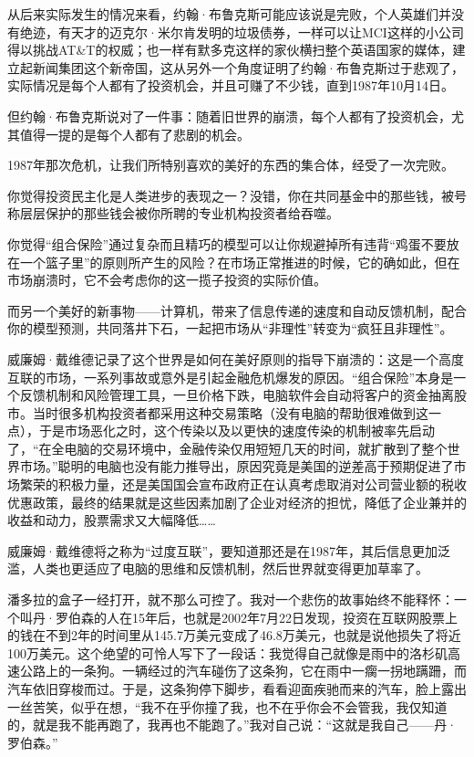 从后来实际发生的情况来看，约翰·布鲁克斯可能应该说是完败，个人英雄们并没有绝迹，有天才的迈克尔·米尔肯发明的垃圾债券，一样可以让MCI这样的小公司得以挑战AT\&T的权威；也一样有默多克这样的家伙横扫整个英语国家的媒体，建立起新闻集团这个新帝国，这从另外一个角度证明了约翰·布鲁克斯过于悲观了，实际情况是每个人都有了投资机会，并且可赚了不少钱，直到1987年10月14日。

但约翰·布鲁克斯说对了一件事：随着旧世界的崩溃，每个人都有了投资机会，尤其值得一提的是每个人都有了悲剧的机会。

1987年那次危机，让我们所特别喜欢的美好的东西的集合体，经受了一次完败。

你觉得投资民主化是人类进步的表现之一？没错，你在共同基金中的那些钱，被号称层层保护的那些钱会被你所聘的专业机构投资者给吞噬。

你觉得``组合保险''通过复杂而且精巧的模型可以让你规避掉所有违背``鸡蛋不要放在一个篮子里''的原则所产生的风险？在市场正常推进的时候，它的确如此，但在市场崩溃时，它不会考虑你的这一揽子投资的实际价值。

而另一个美好的新事物------计算机，带来了信息传递的速度和自动反馈机制，配合你的模型预测，共同落井下石，一起把市场从``非理性''转变为``疯狂且非理性''。

威廉姆·戴维德记录了这个世界是如何在美好原则的指导下崩溃的：这是一个高度互联的市场，一系列事故或意外是引起金融危机爆发的原因。``组合保险''本身是一个反馈机制和风险管理工具，一旦价格下跌，电脑软件会自动将客户的资金抽离股市。当时很多机构投资者都采用这种交易策略（没有电脑的帮助很难做到这一点），于是市场恶化之时，这个传染以及以更快的速度传染的机制被率先启动了，``在全电脑的交易环境中，金融传染仅用短短几天的时间，就扩散到了整个世界市场。''聪明的电脑也没有能力推导出，原因究竟是美国的逆差高于预期促进了市场繁荣的积极力量，还是美国国会宣布政府正在认真考虑取消对公司营业额的税收优惠政策，最终的结果就是这些因素加剧了企业对经济的担忧，降低了企业兼并的收益和动力，股票需求又大幅降低\ldots{}\ldots{}

威廉姆·戴维德将之称为``过度互联''，要知道那还是在1987年，其后信息更加泛滥，人类也更适应了电脑的思维和反馈机制，然后世界就变得更加草率了。

潘多拉的盒子一经打开，就不那么可控了。我对一个悲伤的故事始终不能释怀：一个叫丹·罗伯森的人在15年后，也就是2002年7月22日发现，投资在互联网股票上的钱在不到2年的时间里从145.7万美元变成了46.8万美元，也就是说他损失了将近100万美元。这个绝望的可怜人写下了一段话：我觉得自己就像是雨中的洛杉矶高速公路上的一条狗。一辆经过的汽车碰伤了这条狗，它在雨中一瘸一拐地蹒跚，而汽车依旧穿梭而过。于是，这条狗停下脚步，看看迎面疾驰而来的汽车，脸上露出一丝苦笑，似乎在想，``我不在乎你撞了我，也不在乎你会不会管我，我仅知道的，就是我不能再跑了，我再也不能跑了。''我对自己说：``这就是我自己------丹·罗伯森。''

